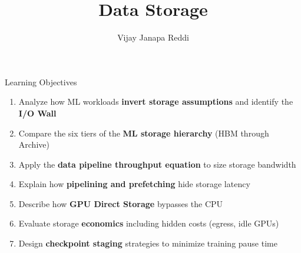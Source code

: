 \documentclass[aspectratio=169, 12pt]{beamer}
\title{Data Storage}
\author{Vijay Janapa Reddi}
\institute{Harvard University}
\date{}
\newcommand{\IOWall}{I/O Wall}
\begin{document}

\begin{frame}{Learning Objectives}

\footnotesize
\begin{enumerate}\setlength\itemsep{0pt}
  \item Analyze how ML workloads \textbf{invert storage assumptions} and identify the \textbf{\IOWall{}}
  \item Compare the six tiers of the \textbf{ML storage hierarchy} (HBM through Archive)
  \item Apply the \textbf{data pipeline throughput equation} to size storage bandwidth
  \item Explain how \textbf{pipelining and prefetching} hide storage latency
  \item Describe how \textbf{GPU Direct Storage} bypasses the CPU
  \item Evaluate storage \textbf{economics} including hidden costs (egress, idle GPUs)
  \item Design \textbf{checkpoint staging} strategies to minimize training pause time
\end{enumerate}

\end{frame}
\end{document}
